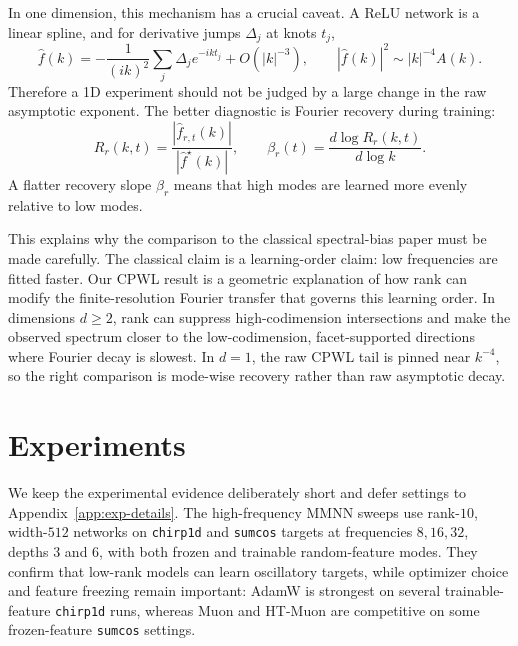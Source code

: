 \documentclass{article}
\newcommand{\wh}{\widehat}
\begin{document}
In one dimension, this mechanism has a crucial caveat. A ReLU network is a linear spline, and for derivative jumps $\Delta_j$ at knots $t_j$,
\begin{equation}
\wh f(k)=
-\frac{1}{(ik)^2}\sum_j \Delta_j e^{-ikt_j}
+O(|k|^{-3}),
\qquad
|\wh f(k)|^2\sim |k|^{-4}A(k).
\end{equation}
Therefore a 1D experiment should not be judged by a large change in the raw asymptotic exponent. The better diagnostic is Fourier recovery during training:
\begin{equation}
R_r(k,t)=\frac{|\wh f_{r,t}(k)|}{|\wh f^\star(k)|},
\qquad
\beta_r(t)=\frac{d\log R_r(k,t)}{d\log k}.
\label{eq:recovery}
\end{equation}
A flatter recovery slope $\beta_r$ means that high modes are learned more evenly relative to low modes.

This explains why the comparison to the classical spectral-bias paper must be made carefully. The classical claim is a learning-order claim: low frequencies are fitted faster. Our CPWL result is a geometric explanation of how rank can modify the finite-resolution Fourier transfer that governs this learning order. In dimensions $d\ge2$, rank can suppress high-codimension intersections and make the observed spectrum closer to the low-codimension, facet-supported directions where Fourier decay is slowest. In $d=1$, the raw CPWL tail is pinned near $k^{-4}$, so the right comparison is mode-wise recovery rather than raw asymptotic decay.

\section{Experiments}
\label{sec:experiments}

We keep the experimental evidence deliberately short and defer settings to Appendix~\ref{app:exp-details}. The high-frequency MMNN sweeps use rank-$10$, width-$512$ networks on \texttt{chirp1d} and \texttt{sumcos} targets at frequencies $8,16,32$, depths $3$ and $6$, with both frozen and trainable random-feature modes. They confirm that low-rank models can learn oscillatory targets, while optimizer choice and feature freezing remain important: AdamW is strongest on several trainable-feature \texttt{chirp1d} runs, whereas Muon and HT-Muon are competitive on some frozen-feature \texttt{sumcos} settings.
\end{document}
